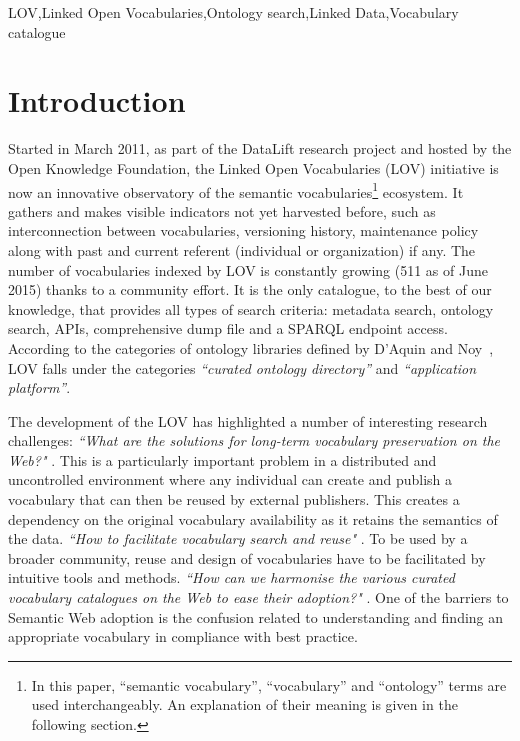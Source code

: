 \documentclass{iosart2c}
\begin{document}
\begin{frontmatter}
\begin{keyword}
LOV\sep Linked Open Vocabularies\sep Ontology search\sep Linked Data\sep Vocabulary catalogue
\end{keyword}

\end{frontmatter}


\section{Introduction}
Started in March 2011, as part of the DataLift research project \cite{scharffe_2012} and hosted by the Open Knowledge Foundation, the Linked Open Vocabularies (LOV) initiative is now an innovative observatory of the semantic vocabularies\footnote{In this paper, ``semantic vocabulary'', ``vocabulary'' and ``ontology'' terms are used interchangeably. An explanation of their meaning is given in the following section.} ecosystem. It gathers and makes visible indicators not yet harvested before, such as interconnection between vocabularies, versioning history, maintenance policy along with past and current referent (individual or organization) if any. The number of vocabularies indexed by LOV is constantly growing (511 as of June 2015) thanks to a community effort. It is the only catalogue, to the best of our knowledge, that provides all types of search criteria: metadata search, ontology search, APIs, comprehensive dump file and a SPARQL endpoint access. According to the categories of ontology libraries defined by D'Aquin and Noy~\cite{AquinJoWS12}, LOV falls under the categories \textit{``curated ontology directory''}  and \textit{``application platform''}. 

The development of the LOV has highlighted a number of interesting research challenges: \textit{``What are the solutions for long-term vocabulary preservation on the Web?"} \cite{Baker2013HLT}. This is a particularly important problem in a distributed and uncontrolled environment where any individual can create and publish a vocabulary that can then be reused by external publishers. This creates a dependency on the original vocabulary availability as it retains the semantics of the data. \textit{``How to facilitate vocabulary search and reuse"} \cite{butt2014, poveda2012landscape}. To be used by a broader community, reuse and design of vocabularies have to be facilitated by intuitive tools and methods.  \textit{``How can we harmonise the various curated vocabulary catalogues on the Web to ease their adoption?"} \cite{wasabi13}. One of the barriers to Semantic Web adoption is the confusion related to understanding and finding an appropriate vocabulary in compliance with best practice.
\end{document}
